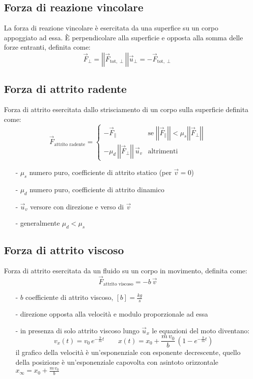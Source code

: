 \documentclass[a4paper]{article}
\newcommand\ux{\vec{u}_x}
\newcommand\uv{\vec{u}_v}
\newcommand\uper{\vec{u}_\perp}
\newcommand\vmod[1]{\left|\left|{#1}\right|\right|}
\begin{document}
\subsection{Forza di reazione vincolare}
La forza di reazione vincolare è esercitata da una superfice su un corpo appoggiato ad essa. È perpendicolare alla superficie e
opposta alla somma delle forze entranti, definita come:
\[\vec{F}_\perp = \vmod{\vec{F}_{\text{tot},\perp}} \uper = -\vec{F}_{\text{tot},\perp}\]

\subsection{Forza di attrito radente}
Forza di attrito esercitata dallo strisciamento di un corpo sulla superficie definita come:
\[\vec{F}_\text{attrito radente} = \begin{cases}
	-\vec{F}_{\parallel} &\text{se} \; \vmod{\vec{F}_\parallel} < \mu_s \vmod{\vec{F}_\perp}\\
	-\mu_d \, \vmod{\vec{F}_\perp} \, \uv &\text{altrimenti}
\end{cases}\]

\begin{itemize}[topsep=3pt, itemsep=0pt]
	\item[-] \(\mu_s\) numero puro, coefficiente di attrito statico (per \(\vec{v}=0\))
	\item[-] \(\mu_d\) numero puro, coefficiente di attrito dinamico
	\item[-] \(\uv\) versore con direzione e verso di \(\vec{v}\)
	\item[-] generalmente \(\mu_d < \mu_s\)
\end{itemize}

\subsection{Forza di attrito viscoso}
Forza di attrito esercitata da un fluido su un corpo in movimento, definita come:
\[\vec{F}_\text{attrito viscoso} = - b \, \vec{v}\]
\begin{itemize}[topsep=3pt, itemsep=0pt]
	\item[-] \(b\) coefficiente di attrito viscoso, \(\left[b\right] = \frac{kg}{s}\)
	\item[-] direzione opposta alla velocità e modulo proporzionale ad essa
	\item[-] in presenza di solo attrito viscoso lungo \(\ux\) le equazioni del moto diventano:
	\[v_x(t) = v_0 \, e^{-\frac{b}{m}t} \qquad x(t) = x_0 + \frac{m \, v_0}{b} \, \left(1-e^{-\frac{b}{m}t}\right)\]
	il grafico della velocità è un'esponenziale con esponente decrescente, quello della posizione è un'esponenziale capovolta con asintoto orizzontale \(x_{\infty} = x_0 + \frac{m \, v_0}{b}\)
\end{itemize}
\end{document}
